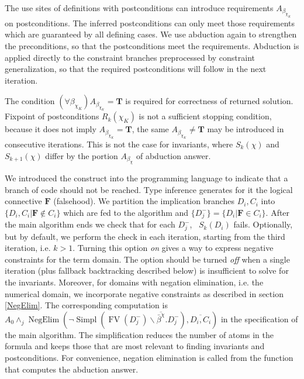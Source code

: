 \documentclass{article}
\newcommand{\nin}{\not\in}
\newcommand{\tmem}[1]{{\em #1\/}}
\newcommand{\tmmathbf}[1]{\ensuremath{\boldsymbol{#1}}}
\newcommand{\tmop}[1]{\ensuremath{\operatorname{#1}}}
\newcommand{\tmverbatim}[1]{{\ttfamily{#1}}}
\begin{document}
The use sites of definitions with postconditions can introduce requirements
$A_{\beta_{\chi_K}}$ on postconditions. The inferred postconditions can only
meet those requirements which are guaranteed by all defining cases. We use
abduction again to strengthen the preconditions, so that the postconditions
meet the requirements. Abduction is applied directly to the constraint
branches preprocessed by constraint generalization, so that the required
postconditions will follow in the next iteration.

The condition $(\forall \beta_{\chi_K}) A_{\beta_{\chi_K}} =\tmmathbf{T}$ is
required for correctness of returned solution. Fixpoint of postconditions $R_k
(\chi_K)$ is not a sufficient stopping condition, because it does not imply
$A_{\beta_{\chi_K}} =\tmmathbf{T}$, the same $A_{\beta_{\chi_K}} \neq
\tmmathbf{T}$ may be introduced in consecutive iterations. This is not the
case for invariants, where $S_k (\chi)$ and $S_{k + 1} (\chi)$ differ by the
portion $A_{\beta_{\chi}}$ of abduction answer.

We introduced the \tmverbatim{assert false} construct into the programming
language to indicate that a branch of code should not be reached. Type
inference generates for it the logical connective $\tmmathbf{F}$ (falsehood).
We partition the implication branches $D_i, C_i$ into $\{ D_i, C_i |
\tmmathbf{F} \nin C_i \}$ which are fed to the algorithm and $\{ D_j^- \} = \{
D_i | \tmmathbf{F} \in C_i \}$. After the main algorithm ends we check that
for each $D_j^-$, \ $S_k (D_i)$ fails. Optionally, but by default, we perform
the check in each iteration, starting from the third iteration, i.e. $k > 1$.
Turning this option {\tmem{on}} gives a way to express negative constraints
for the term domain. The option should be turned {\tmem{off}} when a single
iteration (plus fallback backtracking described below) is insufficient to
solve for the invariants. Moreover, for domains with negation elimination,
i.e. the numerical domain, we incorporate negative constraints as described in
section \ref{NegElim}. The corresponding computation is $A_0 \wedge_j
\tmop{NegElim} (\neg \tmop{Simpl} (\tmop{FV} (D_j^-) \backslash
\overline{\bar{\beta}^{\chi}} .D_j^-), \overline{D_i, C_i})$ in the
specification of the main algorithm. The simplification reduces the number of
atoms in the formula and keeps those that are most relevant to finding
invariants and postconditions. For convenience, negation elimination is called
from the function that computes the abduction answer.
\end{document}
